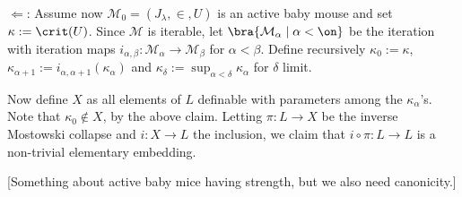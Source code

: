 {$\Leftarrow$: Assume now $\mathcal M_0=(J_\lambda,\in,U)$ is an active baby mouse and set $\kappa:=\crit(U)$. Since $\mathcal M$ is iterable, let $\bra{\mathcal M_\alpha\mid \alpha<\on}$ be the iteration with iteration maps $i_{\alpha,\beta}:\mathcal M_\alpha\to\mathcal M_\beta$ for $\alpha<\beta$. Define recursively $\kappa_0:=\kappa$, $\kappa_{\alpha+1}:=i_{\alpha,\alpha+1}(\kappa_\alpha)$ and $\kappa_\delta:=\sup_{\alpha<\delta}\kappa_\alpha$ for $\delta$ limit.



Now define $X$ as all elements of $L$ definable with parameters among the $\kappa_\alpha$'s. Note that $\kappa_0\notin X$, by the above claim. Letting $\pi:L\to X$ be the inverse Mostowski collapse and $i:X\to L$ the inclusion, we claim that $i\circ\pi:L\to L$ is a non-trivial elementary embedding. 
}

[Something about active baby mice having strength, but we also need canonicity.]



